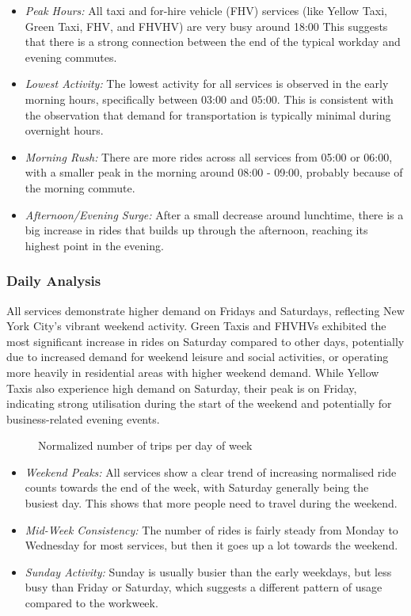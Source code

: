 \documentclass[conference]{IEEEtran}
\begin{document}
\begin{itemize}
  \item \emph{Peak Hours:}  All taxi and for-hire vehicle (FHV) services (like Yellow Taxi, Green Taxi, FHV, and FHVHV)
    are very busy around 18:00 This suggests that there is a strong connection between the end of the typical workday
    and evening commutes.
  \item \emph{Lowest Activity:} The lowest activity for all services is observed in the early morning hours, specifically
    between 03:00 and 05:00. This is consistent with the observation that demand for transportation is typically minimal
    during overnight hours.
  \item \emph{Morning Rush:} There are more rides across all services from 05:00 or 06:00, with a smaller peak in the
    morning around 08:00 - 09:00, probably because of the morning commute.
  \item \emph{Afternoon/Evening Surge:} After a small decrease around lunchtime, there is a big increase in rides that
    builds up through the afternoon, reaching its highest point in the evening.
\end{itemize}

\subsubsection{Daily Analysis}

All services demonstrate higher demand on Fridays and Saturdays, reflecting New York City's vibrant weekend activity.
Green Taxis and FHVHVs exhibited the most significant increase in rides on Saturday compared to other days, potentially
due to increased demand for weekend leisure and social activities, or operating more heavily in residential areas with
higher weekend demand. While Yellow Taxis also experience high demand on Saturday, their peak is on Friday, indicating
strong utilisation during the start of the weekend and potentially for business-related evening events.

\begin{figure}[htbp]
  \label{fig:daily-bar-plot}
  \centering
  
  \caption{Normalized number of trips per day of week}
\end{figure}

\begin{itemize}
  \item \emph{Weekend Peaks:} All services show a clear trend of increasing normalised ride counts towards the end of
    the week, with Saturday generally being the busiest day. This shows that more people need to travel during the weekend.
  \item \emph{Mid-Week Consistency:} The number of rides is fairly steady from Monday to Wednesday for most services,
    but then it goes up a lot towards the weekend.
  \item \emph{Sunday Activity:} Sunday is usually busier than the early weekdays, but less busy than Friday or Saturday,
    which suggests a different pattern of usage compared to the workweek.
\end{itemize}
\end{document}

